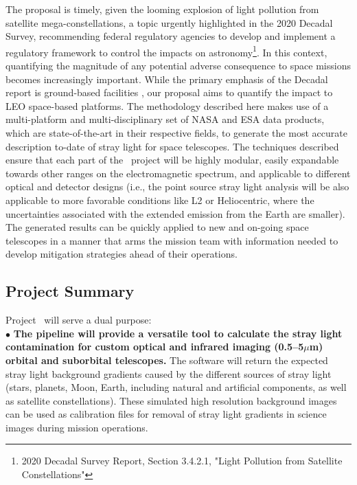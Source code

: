 \documentclass[usenames,dvipsnames,modern]{CLASS_FILES/aastex631}  %
\begin{document}
The proposal is timely, given the looming explosion of light pollution from satellite mega-constellations, a topic urgently highlighted in the 2020 Decadal Survey, recommending federal regulatory agencies to develop and implement a regulatory framework to control the impacts on astronomy\footnote{2020 Decadal Survey Report, Section 3.4.2.1, "Light Pollution from Satellite Constellations"}. In this context, quantifying the magnitude of any potential adverse consequence to space missions becomes increasingly important. While the primary emphasis of the Decadal report is ground-based facilities \citep[e.g., Rubin telescope,][]{tyson+2020aj160_226}, our proposal aims to quantify the impact to LEO space-based platforms. The methodology described here makes use of a multi-platform and multi-disciplinary set of NASA and ESA data products, which are state-of-the-art in their respective fields, to generate the most accurate description to-date of stray light for space telescopes. The techniques described ensure that each part of the \MyName\ project will be highly modular, easily expandable towards other ranges on the electromagnetic spectrum, and applicable to different optical and detector designs (i.e., the point source stray light analysis will be also applicable to more favorable conditions like L2 or Heliocentric, where the uncertainties associated with the extended emission from the Earth are smaller). The generated results can be quickly applied to new and on-going space telescopes in a manner that arms the mission team with information needed to develop mitigation strategies ahead of their operations.

\subsection{Project Summary}
Project \MyName\ will serve a dual purpose:\\

$\bullet$ \textbf{The pipeline will provide a versatile tool to calculate the stray light contamination for custom optical and infrared imaging (0.5--5$\mu$m) orbital and suborbital telescopes.} The software will return the expected stray light background gradients caused by the different sources of stray light (stars, planets, Moon, Earth, including natural and artificial components, as well as satellite constellations). These simulated high resolution background images can be used as calibration files for removal of stray light gradients in science images during mission operations. \\
\end{document}

